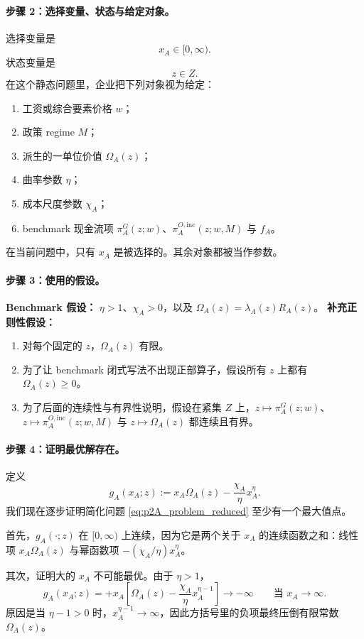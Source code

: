 \paragraph{步骤 2：选择变量、状态与给定对象。}
选择变量是
\[
x_A\in[0,\infty).
\]
状态变量是
\[
z\in Z.
\]
在这个静态问题里，企业把下列对象视为给定：
\begin{enumerate}
    \item 工资或综合要素价格 $w$；
    \item 政策 regime $M$；
    \item 派生的一单位价值 $\Omega_A(z)$；
    \item 曲率参数 $\eta$；
    \item 成本尺度参数 $\chi_A$；
    \item benchmark 现金流项 $\pi_A^G(z;w)$、$\pi_A^{O,\mathrm{inc}}(z;w,M)$ 与 $f_A$。
\end{enumerate}
在当前问题中，只有 $x_A$ 是被选择的。其余对象都被当作参数。

\paragraph{步骤 3：使用的假设。}
\textbf{Benchmark 假设：} $\eta>1$、$\chi_A>0$，以及 $\Omega_A(z)=\lambda_A(z)R_A(z)$。  
\textbf{补充正则性假设：}
\begin{enumerate}
    \item[(A1)] 对每个固定的 $z$，$\Omega_A(z)$ 有限。
    \item[(A2)] 为了让 benchmark 闭式写法不出现正部算子，假设所有 $z$ 上都有 $\Omega_A(z)\ge 0$。
    \item[(A3)] 为了后面的连续性与有界性说明，假设在紧集 $Z$ 上，$z\mapsto \pi_A^G(z;w)$、$z\mapsto \pi_A^{O,\mathrm{inc}}(z;w,M)$ 与 $z\mapsto \Omega_A(z)$ 都连续且有界。
\end{enumerate}

\paragraph{步骤 4：证明最优解存在。}
定义
\[
g_A(x_A;z):=x_A\Omega_A(z)-\frac{\chi_A}{\eta}x_A^\eta.
\]
我们现在逐步证明简化问题 \eqref{eq:p2A_problem_reduced} 至少有一个最大值点。

首先，$g_A(\cdot;z)$ 在 $[0,\infty)$ 上连续，因为它是两个关于 $x_A$ 的连续函数之和：线性项 $x_A\Omega_A(z)$ 与幂函数项 $-(\chi_A/\eta)x_A^\eta$。

其次，证明大的 $x_A$ 不可能最优。由于 $\eta>1$，
\[
g_A(x_A;z)
=
+x_A\left[\Omega_A(z)-\frac{\chi_A}{\eta}x_A^{\eta-1}\right]\to -\infty
\qquad\text{当 }x_A\to\infty.
\]
原因是当 $\eta-1>0$ 时，$x_A^{\eta-1}\to\infty$，因此方括号里的负项最终压倒有限常数 $\Omega_A(z)$。

